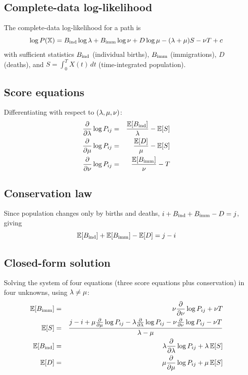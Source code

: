\subsection{Complete-data log-likelihood}

The complete-data log-likelihood for a path is
\[
\log P(\mathbb{X}) = B_{\mathrm{ind}}\log\lambda + B_{\mathrm{imm}}\log\nu + D\log\mu
  - (\lambda + \mu)S - \nu T + c
\]
with sufficient statistics $B_{\mathrm{ind}}$ (individual births), $B_{\mathrm{imm}}$ (immigrations),
$D$ (deaths), and $S = \int_0^T X(t)\,dt$ (time-integrated population).

\subsection{Score equations}

Differentiating with respect to $(\lambda, \mu, \nu)$:
\begin{eqnarray*}
\frac{\partial}{\partial\lambda}\log P_{ij} & = & \frac{\mathbb{E}[B_{\mathrm{ind}}]}{\lambda} - \mathbb{E}[S] \\
\frac{\partial}{\partial\mu}\log P_{ij} & = & \frac{\mathbb{E}[D]}{\mu} - \mathbb{E}[S] \\
\frac{\partial}{\partial\nu}\log P_{ij} & = & \frac{\mathbb{E}[B_{\mathrm{imm}}]}{\nu} - T
\end{eqnarray*}

\subsection{Conservation law}

Since population changes only by births and deaths, $i + B_{\mathrm{ind}} + B_{\mathrm{imm}} - D = j$, giving
\begin{equation}\label{eq:conservation-general}
\mathbb{E}[B_{\mathrm{ind}}] + \mathbb{E}[B_{\mathrm{imm}}] - \mathbb{E}[D] = j - i
\end{equation}

\subsection{Closed-form solution}

Solving the system of four equations (three score equations plus conservation) in four unknowns,
using $\lambda \neq \mu$:
\begin{eqnarray*}
\mathbb{E}[B_{\mathrm{imm}}] & = & \nu\frac{\partial}{\partial\nu}\log P_{ij} + \nu T \\
\mathbb{E}[S] & = & \frac{j - i
  + \mu\frac{\partial}{\partial\mu}\log P_{ij}
  - \lambda\frac{\partial}{\partial\lambda}\log P_{ij}
  - \nu\frac{\partial}{\partial\nu}\log P_{ij}
  - \nu T}{\lambda - \mu} \\
\mathbb{E}[B_{\mathrm{ind}}] & = & \lambda\frac{\partial}{\partial\lambda}\log P_{ij} + \lambda\,\mathbb{E}[S] \\
\mathbb{E}[D] & = & \mu\frac{\partial}{\partial\mu}\log P_{ij} + \mu\,\mathbb{E}[S]
\end{eqnarray*}


